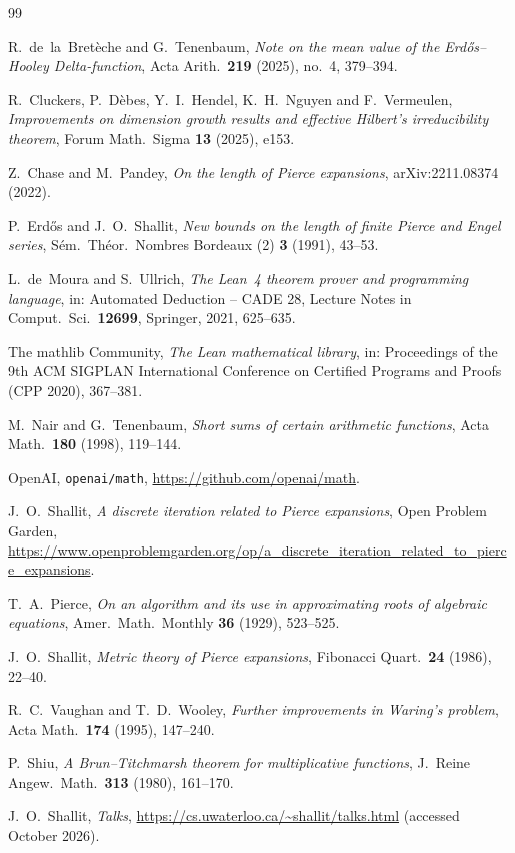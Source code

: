 \documentclass[11pt]{amsart}
\theoremstyle{definition}
\theoremstyle{remark}
\begin{document}
\begin{thebibliography}{99}

R.~de~la~Bret\`eche and G.~Tenenbaum,
\emph{Note on the mean value of the Erd\H{o}s--Hooley Delta-function},
Acta Arith.\ \textbf{219} (2025), no.~4, 379--394.

R.~Cluckers, P.~D\`ebes, Y.~I.~Hendel, K.~H.~Nguyen and F.~Vermeulen,
\emph{Improvements on dimension growth results and effective Hilbert's irreducibility theorem},
Forum Math.\ Sigma \textbf{13} (2025), e153.

Z.~Chase and M.~Pandey,
\emph{On the length of Pierce expansions},
arXiv:2211.08374 (2022).

P.~Erd\H{o}s and J.~O.~Shallit,
\emph{New bounds on the length of finite Pierce and Engel series},
S\'em.\ Th\'eor.\ Nombres Bordeaux (2) \textbf{3} (1991), 43--53.

L.~de~Moura and S.~Ullrich,
\emph{The Lean~4 theorem prover and programming language},
in: Automated Deduction -- CADE 28, Lecture Notes in Comput.\ Sci.\ \textbf{12699},
Springer, 2021, 625--635.

The mathlib Community,
\emph{The Lean mathematical library},
in: Proceedings of the 9th ACM SIGPLAN International Conference on Certified Programs and
Proofs (CPP 2020), 367--381.

M.~Nair and G.~Tenenbaum,
\emph{Short sums of certain arithmetic functions},
Acta Math.\ \textbf{180} (1998), 119--144.

OpenAI,
\texttt{openai/math}, \url{https://github.com/openai/math}.

J.~O.~Shallit,
\emph{A discrete iteration related to Pierce expansions},
Open Problem Garden,
\url{https://www.openproblemgarden.org/op/a_discrete_iteration_related_to_pierce_expansions}.

T.~A.~Pierce,
\emph{On an algorithm and its use in approximating roots of algebraic equations},
Amer.\ Math.\ Monthly \textbf{36} (1929), 523--525.

J.~O.~Shallit,
\emph{Metric theory of Pierce expansions},
Fibonacci Quart.\ \textbf{24} (1986), 22--40.

R.~C.~Vaughan and T.~D.~Wooley,
\emph{Further improvements in Waring's problem},
Acta Math.\ \textbf{174} (1995), 147--240.

P.~Shiu,
\emph{A Brun--Titchmarsh theorem for multiplicative functions},
J.\ Reine Angew.\ Math.\ \textbf{313} (1980), 161--170.

J.~O.~Shallit,
\emph{Talks}, \url{https://cs.uwaterloo.ca/~shallit/talks.html}
(accessed October 2026).

\end{thebibliography}
\end{document}
